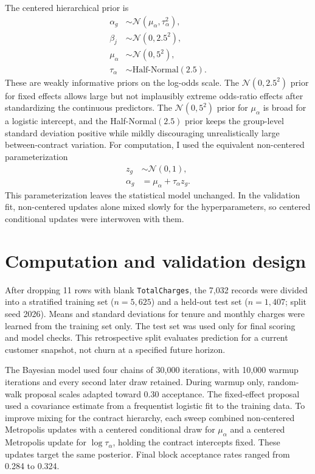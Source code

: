 \documentclass{article}
\begin{document}
The centered hierarchical prior is
\begin{align}
\alpha_g &\sim \mathcal{N}(\mu_\alpha, \tau_\alpha^2),\\
\beta_j &\sim \mathcal{N}(0,2.5^2),\\
\mu_\alpha &\sim \mathcal{N}(0,5^2),\\
\tau_\alpha &\sim \text{Half-Normal}(2.5).
\end{align}
These are weakly informative priors on the log-odds scale. The $\mathcal{N}(0,2.5^2)$ prior for fixed effects allows large but not implausibly extreme odds-ratio effects after standardizing the continuous predictors. The $\mathcal{N}(0,5^2)$ prior for $\mu_\alpha$ is broad for a logistic intercept, and the Half-Normal$(2.5)$ prior keeps the group-level standard deviation positive while mildly discouraging unrealistically large between-contract variation.
For computation, I used the equivalent non-centered parameterization
\begin{align}
z_g &\sim \mathcal{N}(0,1),\\
\alpha_g &= \mu_\alpha + \tau_\alpha z_g.
\end{align}
This parameterization leaves the statistical model unchanged. In the validation fit, non-centered updates alone mixed slowly for the hyperparameters, so centered conditional updates were interwoven with them.

\section{Computation and validation design}

After dropping 11 rows with blank \texttt{TotalCharges}, the 7,032 records were divided into a stratified training set ($n=5,625$) and a held-out test set ($n=1,407$; split seed 2026). Means and standard deviations for tenure and monthly charges were learned from the training set only. The test set was used only for final scoring and model checks. This retrospective split evaluates prediction for a current customer snapshot, not churn at a specified future horizon.

The Bayesian model used four chains of 30,000 iterations, with 10,000 warmup iterations and every second later draw retained. During warmup only, random-walk proposal scales adapted toward 0.30 acceptance. The fixed-effect proposal used a covariance estimate from a frequentist logistic fit to the training data. To improve mixing for the contract hierarchy, each sweep combined non-centered Metropolis updates with a centered conditional draw for $\mu_\alpha$ and a centered Metropolis update for $\log\tau_\alpha$, holding the contract intercepts fixed. These updates target the same posterior. Final block acceptance rates ranged from 0.284 to 0.324.
\end{document}
